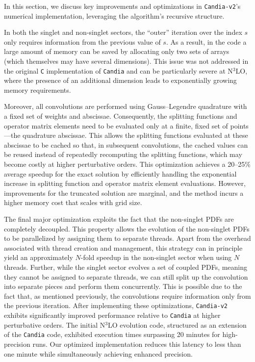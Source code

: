 \documentclass[12pt,notitlepage,aps,preprintnumbers,superscriptaddress,nofootinbib,aps,prd,floatfix]{revtex4-2}
\begin{document}
In this section, we discuss key improvements and optimizations in \texttt{Candia-v2}’s numerical implementation, leveraging the algorithm’s recursive structure. 

In both the singlet and non-singlet sectors, the ``outer'' iteration over the index $s$ only requires information from the previous value of $s$. As a result, in the code a large amount of memory can be saved by allocating only two sets of arrays (which themselves may have several dimensions). 
%
This issue was not addressed in the original \texttt{C} implementation of \texttt{Candia} and can be particularly severe at N$^3$LO, where the presence of an additional dimension leads to exponentially growing memory requirements.

Moreover, all convolutions are performed using Gauss–Legendre quadrature with a fixed set of weights and abscissae. Consequently, the splitting functions and operator matrix elements need to be evaluated only at a finite, fixed set of points—the quadrature abscissae. This allows the splitting functions evaluated at these abscissae to be cached so that, in subsequent convolutions, the cached values can be reused instead of repeatedly recomputing the splitting functions, which may become costly at higher perturbative orders. This optimization achieves a 20–25\% average speedup for the exact solution by efficiently handling the exponential increase in splitting function and operator matrix element evaluations. However, improvements for the truncated solution are marginal, and the method incurs a higher memory cost that scales with grid size.

The final major optimization exploits the fact that the non-singlet PDFs are completely decoupled. This property allows the evolution of the non-singlet PDFs to be parallelized by assigning them to separate threads. Apart from the overhead associated with thread creation and management, this strategy can in principle yield an approximately 
$N$-fold speedup in the non-singlet sector when using $N$ threads. 
Further, while the singlet sector evolves a set of coupled PDFs, meaning they cannot be assigned to separate threads, we can still split up the convolution into separate pieces and perform them concurrently. This is possible due to the fact that, as mentioned previously, the convolutions require information only from the previous iteration.
%
After implementing these optimizations, \texttt{Candia-v2} exhibits significantly improved performance relative to \texttt{Candia} at higher perturbative orders. The initial N$^3$LO evolution code, structured as an extension of the \texttt{Candia} code, exhibited execution times surpassing 20 minutes for high-precision runs. Our optimized implementation reduces this latency to less than one minute while simultaneously achieving enhanced precision.
\end{document}
